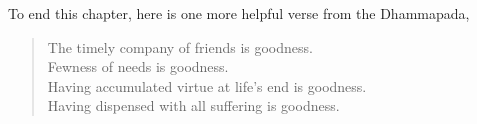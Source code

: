 To end this chapter, here is one more helpful verse from the Dhammapada,

\begin{quote}
  The timely company of friends is goodness.\\
  Fewness of needs is goodness.\\
  Having accumulated virtue at life's end is goodness.\\
  Having dispensed with all suffering is goodness.

\end{quote}

